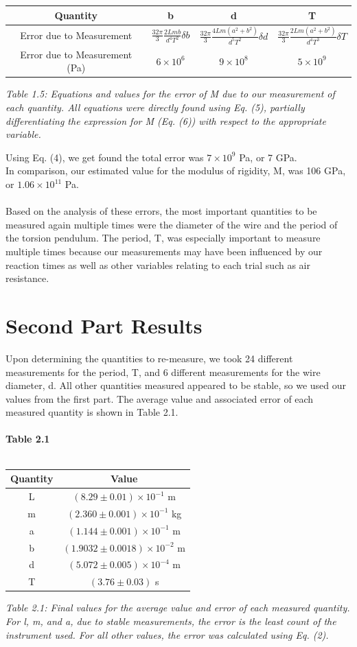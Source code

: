 \documentclass[leqno]{article}
\begin{document}
\begin{tabular}{|c|c|c|c|}
\hline
Quantity & b & d & T\\
\hline
Error due to Measurement & $\frac{32\pi}{3}\frac{2Lmb}{d^4 T^2}\delta b$ & $\frac{32\pi}{3}\frac{4Lm(a^2+b^2)}{d^5 T^2}\delta d$ & $\frac{32\pi}{3}\frac{2Lm(a^2+b^2)}{d^4 T^3}\delta T$\\
\hline
Error due to Measurement (Pa)& $6\times10^6$ & $9\times10^8$ & $5\times10^9$\\
\hline
\end{tabular}
\begin{flushleft}
\textit{\small Table 1.5: Equations and values for the error of M due to our measurement of each quantity.  All equations were directly found using Eq. (5), partially differentiating the expression for M (Eq. (6)) with respect to the appropriate variable.}
\end{flushleft}
Using Eq. (4), we get found the total error was $7 \times 10^9$ Pa, or 7 GPa.\\
In comparison, our estimated value for the modulus of rigidity, M, was 106 GPa, or $1.06\times10^{11}$ Pa.\\\\
Based on the analysis of these errors, the most important quantities to be measured again multiple times were the diameter of the wire and the period of the torsion pendulum.  The period, T, was especially important to measure multiple times because our measurements may have been influenced by our reaction times as well as other variables relating to each trial such as air resistance.
\section*{Second Part Results}
Upon determining the quantities to re-measure, we took 24 different measurements for the period, T, and 6 different measurements for the wire diameter, d.  All other quantities measured appeared to be stable, so we used our values from the first part.  The average value  and associated error of each measured quantity is shown in Table 2.1.\\\\
\textbf{Table 2.1}\\\\
\begin{tabular}{c|c}
	Quantity & Value\\
	\hline
	L & $(8.29\pm0.01)\times 10^{-1}$ m\\
	m & $(2.360\pm0.001)\times 10^{-1}$ kg\\
	a & $(1.144\pm0.001)\times 10^{-1}$ m\\
	b & $(1.9032\pm0.0018)\times10^{-2}$ m\\
	d & $(5.072\pm0.005)\times 10^{-4}$ m\\
	T & $(3.76\pm0.03)$ s\\
\end{tabular}
\begin{flushleft}
\textit{\small Table 2.1: Final values for the average value and error of each measured quantity.  For l, m, and a, due to stable measurements, the error is the least count of the instrument used.  For all other values, the error was calculated using Eq. (2).}
\end{flushleft}
\end{document}
